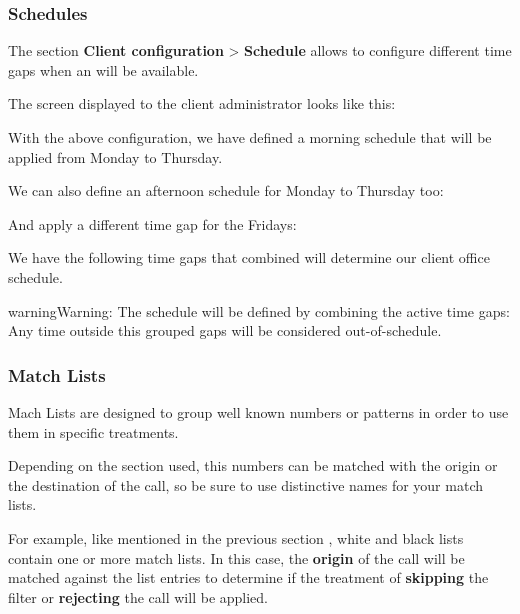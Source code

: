 \documentclass[letterpaper,10pt,english]{sphinxmanual}
\begin{document}
\subsubsection{Schedules}
\label{administration_portal/client/vpbx/routing_tools/schedules::doc}\label{administration_portal/client/vpbx/routing_tools/schedules:schedules}
The section \textbf{Client configuration} \textgreater{} \textbf{Schedule} allows to configure
different time gaps when an {\hyperref[administration_portal/client/vpbx/ddis:ddis]{}} will be available.

The screen displayed to the client administrator looks like this:

With the above configuration, we have defined a morning schedule that will be
applied from Monday to Thursday.

We can also define an afternoon schedule for Monday to Thursday too:

And apply a different time gap for the Fridays:

We have the following time gaps that combined will determine our client
office schedule.

\begin{notice}{warning}{Warning:}
The schedule will be defined by combining the active time gaps:
Any time outside this grouped gaps will be considered out-of-schedule.
\end{notice}


\subsubsection{Match Lists}
\label{administration_portal/client/vpbx/routing_tools/match_lists:match-lists}\label{administration_portal/client/vpbx/routing_tools/match_lists::doc}\label{administration_portal/client/vpbx/routing_tools/match_lists:id1}
Mach Lists are designed to group well known numbers or patterns in order to use
them in specific treatments.

Depending on the section used, this numbers can be matched with the origin or
the destination of the call, so be sure to use distinctive names for your match
lists.

For example, like mentioned in the previous section {\hyperref[administration_portal/client/vpbx/routing_tools/external_call_filters:external\string-filters]{}},
white and black lists contain one or more match lists. In this case, the
\textbf{origin} of the call will be matched against the list entries to determine if
the treatment of \textbf{skipping} the filter or \textbf{rejecting} the call will be applied.
\end{document}
